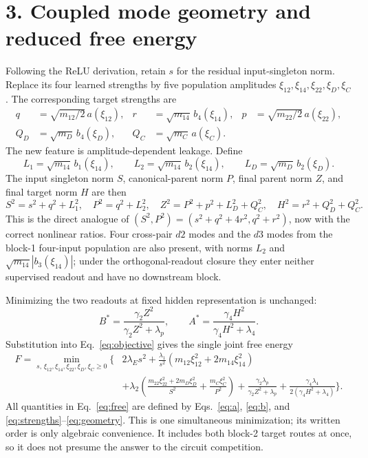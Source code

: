\documentclass[10pt]{article}
\begin{document}
\section*{3. Coupled mode geometry and reduced free energy}
Following the ReLU derivation, retain $s$ for the residual input-singleton norm.  Replace its
four learned strengths by five population amplitudes
$\xi_{12},\xi_{14},\xi_{22},\xi_D,\xi_C$.  The corresponding target strengths are
\begin{align}
q&=\sqrt{m_{12}/2}\,a(\xi_{12}),&
r&=\sqrt{m_{14}}\,b_4(\xi_{14}),&
p&=\sqrt{m_{22}/2}\,a(\xi_{22}),\nonumber\\[-2pt]
Q_D&=\sqrt{m_D}\,b_4(\xi_D),&
Q_C&=\sqrt{m_C}\,a(\xi_C).
\label{eq:strengths}
\end{align}
The new feature is amplitude-dependent leakage.  Define
\begin{equation}
L_1=\sqrt{m_{14}}\,b_1(\xi_{14}),\qquad
L_2=\sqrt{m_{14}}\,b_2(\xi_{14}),\qquad
L_D=\sqrt{m_D}\,b_2(\xi_D).
\label{eq:leakage}
\end{equation}
The input singleton norm $S$, canonical-parent norm $P$, final parent norm $Z$, and final
target norm $H$ are then
\begin{equation}
\boxed{S^2=s^2+q^2+L_1^2,\quad P^2=q^2+L_2^2,\quad
Z^2=P^2+p^2+L_D^2+Q_C^2,\quad H^2=r^2+Q_D^2+Q_C^2.}
\label{eq:geometry}
\end{equation}
This is the direct analogue of $(S^2,P^2)=(s^2+q^2+4r^2,q^2+r^2)$, now with the
correct nonlinear ratios.  Four cross-pair $d2$ modes and the $d3$ modes from the block-1
four-input population are also present, with norms $L_2$ and
$\sqrt{m_{14}}|b_3(\xi_{14})|$; under the orthogonal-readout closure they enter neither
supervised readout and have no downstream block.

Minimizing the two readouts at fixed hidden representation is unchanged:
\begin{equation}
B^*=\frac{\gamma_2Z^2}{\gamma_2Z^2+\lambda_p},\qquad
A^*=\frac{\gamma_4H^2}{\gamma_4H^2+\lambda_4}.
\label{eq:readouts}
\end{equation}
Substitution into Eq.~\eqref{eq:objective} gives the single joint free energy
\begin{align}
F=\min_{s,\,\xi_{12},\xi_{14},\xi_{22},\xi_D,\xi_C\geq0}\Bigg\{&
2\lambda_Es^2
+\frac{\lambda_1}{s^2}\left(m_{12}\xi_{12}^2+2m_{14}\xi_{14}^2\right)\nonumber\\[-2pt]
&+\lambda_2\left(\frac{m_{22}\xi_{22}^2+2m_D\xi_D^2}{S^2}
+\frac{m_C\xi_C^2}{P^2}\right)
+\frac{\gamma_2\lambda_p}{\gamma_2Z^2+\lambda_p}
+\frac{\gamma_4\lambda_4}{2(\gamma_4H^2+\lambda_4)}\Bigg\}.
\label{eq:free}
\end{align}
All quantities in Eq.~\eqref{eq:free} are defined by
Eqs.~\eqref{eq:a}, \eqref{eq:b}, and \eqref{eq:strengths}--\eqref{eq:geometry}.  This is
one simultaneous minimization; its written order is only algebraic convenience.  It includes
both block-2 target routes at once, so it does not presume the answer to the circuit
competition.
\end{document}
